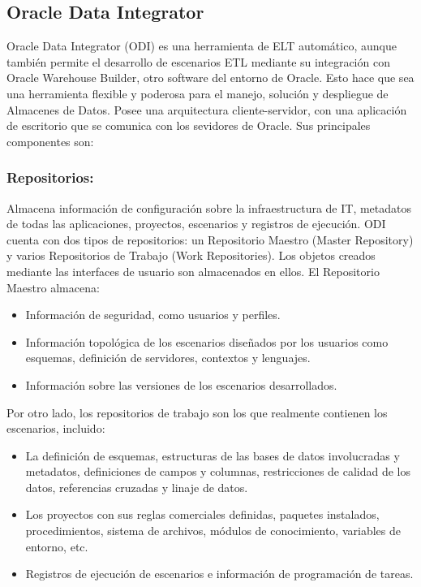 \subsection{Oracle Data Integrator}

Oracle Data Integrator (ODI) es una herramienta de ELT autom\'atico, aunque también permite el desarrollo de escenarios 
ETL mediante su integración con Oracle Warehouse Builder, otro software del entorno de Oracle. Esto hace que sea una 
herramienta flexible y poderosa para el manejo, soluci\'on y despliegue de Almacenes de Datos. Posee una arquitectura 
cliente-servidor, con una aplicaci\'on de escritorio que se comunica con los sevidores de Oracle. Sus principales 
componentes son: 

\subsubsection{Repositorios:} 
Almacena información de configuración sobre la infraestructura de IT, metadatos de todas las aplicaciones, proyectos, 
escenarios y registros de ejecución. ODI cuenta con dos tipos de repositorios: un Repositorio Maestro (Master Repository) 
y varios Repositorios de Trabajo (Work Repositories). Los objetos creados mediante las interfaces de usuario son almacenados 
en ellos. El Repositorio Maestro almacena:

\begin{itemize}
    \item Información de seguridad, como usuarios y perfiles.
    \item Información topol\'ogica de los escenarios diseñados por los usuarios como esquemas, definici\'on de servidores, 
        contextos y lenguajes.
    \item Información sobre las versiones de los escenarios desarrollados.
\end{itemize}

Por otro lado, los repositorios de trabajo son los que realmente 
contienen los escenarios, incluido: 

\begin{itemize}
    \item La definición de esquemas, estructuras de las bases de datos involucradas y metadatos, 
        definiciones de campos y columnas, restricciones de calidad de los datos, referencias cruzadas y linaje de datos.
    \item Los proyectos con sus reglas comerciales definidas, paquetes instalados, procedimientos, 
        sistema de archivos, módulos de conocimiento, variables de entorno, etc.
    \item Registros de ejecución de escenarios e información de programación de tareas.
\end{itemize}

